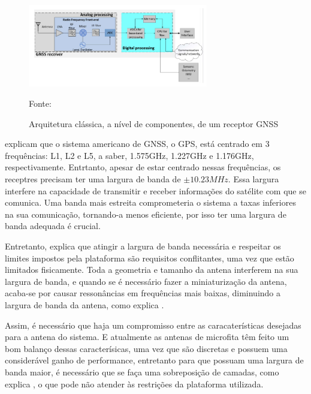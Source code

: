 \begin{figure}[h]
    \centering
     \caption{Arquitetura clássica, a nível de componentes, de um receptor GNSS}
    \includegraphics[width = 0.7\textwidth]{figuras/GNSS_componentes.png}
    
     Fonte: \cite{Antreich2022}
    \label{fig:GNSS_components}
\end{figure}

\cite{Teunissen2017} explicam que o sistema americano de GNSS, o GPS, está centrado em 3 frequências: L1, L2 e L5, a saber, 1.575GHz, 1.227GHz e 1.176GHz, respectivamente. Entrtanto, apesar de estar centrado nessas frequências, os receptres precisam ter uma largura de banda de $\pm 10.23 MHz$. Essa largura interfere na capacidade de transmitir e receber informações do satélite com que se comunica. Uma banda mais estreita comprometeria o sistema a taxas inferiores na sua comunicação, tornando-a menos eficiente, por isso ter uma largura de banda adequada é crucial.

Entretanto, \cite{Antennas2012} explica que atingir a largura de banda necessária e respeitar os limites impostos pela plataforma são requisitos conflitantes, uma vez que estão limitados fisicamente. Toda a geometria e tamanho da antena interferem na sua largura de banda, e quando se é necessário fazer a miniaturização da antena, acaba-se por causar ressonâncias em frequências mais baixas, diminuindo a largura de banda da antena, como explica \cite{Antreich2022}.

Assim, é necessário que haja um compromisso entre as caracaterísticas desejadas para a antena do sistema. E atualmente as antenas de microfita têm feito um bom balanço dessas caracterísicas, uma vez que são discretas e possuem uma considerável ganho de performance, entretanto para que possuam uma largura de banda maior, é necessário que se faça uma sobreposição de camadas, como explica \cite{Teunissen2017}, o que pode não atender às restrições da plataforma utilizada.

